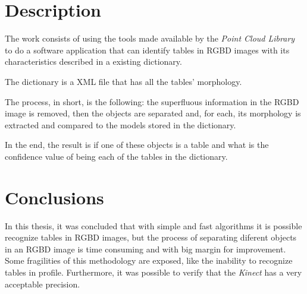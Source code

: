 \documentclass[9pt,a4paper]{extarticle}
\begin{document}
\begin{multicols}{2}
\section{Description}\label{sec:work}

The work consists of using the tools made available by the  \emph{Point Cloud Library} to do a software
application that can identify tables in RGBD images with its characteristics described in a existing
dictionary.

The dictionary is a XML file that has all the tables' morphology.

The process, in short, is the following: the superfluous information in the RGBD image is removed, then
the objects are separated and, for each, its morphology is extracted and compared to the models stored
in the dictionary.

In the end, the result is if one of these objects is a table and what is the confidence value of being
each of the tables in the dictionary.


\section{Conclusions}\label{sec:conclui}

In this thesis, it was concluded that with simple and fast algorithms it is possible recognize tables in
RGBD images, but the process of separating diferent objects in an RGBD image is time consuming and with
big margin for improvement. Some fragilities of this methodology are exposed, like the inability to 
recognize tables in profile. Furthermore, it was possible to verify that the \emph{Kinect} has a very
acceptable precision.

%

\end{multicols}
\end{document}
